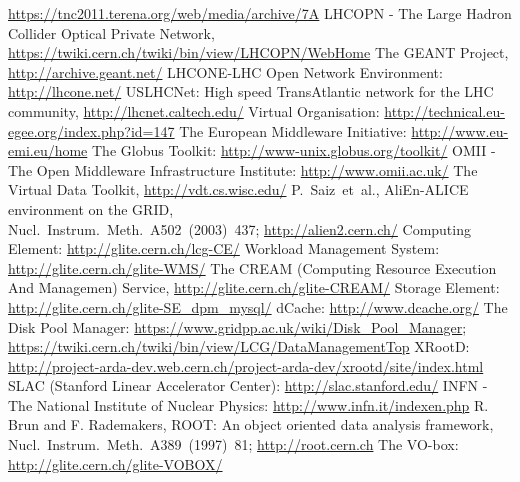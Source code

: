 \begin{thebibliography}{100}
       \newline\url{https://tnc2011.terena.org/web/media/archive/7A}
%
 LHCOPN - The Large Hadron Collider Optical Private Network,
\newline\url{https://twiki.cern.ch/twiki/bin/view/LHCOPN/WebHome}
%
 The GEANT Project, \url{http://archive.geant.net/}
%
 LHCONE-LHC Open Network Environment:
\newline\url{http://lhcone.net/}
%
 USLHCNet: High speed TransAtlantic network for the LHC community,
\newline\url{http://lhcnet.caltech.edu/}
%
%
 Virtual Organisation: \url{http://technical.eu-egee.org/index.php?id=147}
%
 The European Middleware Initiative:
\url{http://www.eu-emi.eu/home}
%
 The Globus Toolkit: \url{http://www-unix.globus.org/toolkit/}
%
OMII - The Open Middleware Infrastructure Institute:
\url{http://www.omii.ac.uk/}
%
 The Virtual Data Toolkit, \url{http://vdt.cs.wisc.edu/}
%
 P.~Saiz~et~al.,  AliEn-ALICE environment on the GRID,\\
Nucl.~Instrum.~Meth.~A502~(2003)~437; \url{http://alien2.cern.ch/}
%
 Computing Element: \url{http://glite.cern.ch/lcg-CE/}
%
 Workload Management System: \url{http://glite.cern.ch/glite-WMS/}
%
 The CREAM (Computing Resource Execution And Managemen) Service,
\newline\url{http://glite.cern.ch/glite-CREAM/}
%
 Storage Element: \url{http://glite.cern.ch/glite-SE_dpm_mysql/}
%
 dCache: \url{http://www.dcache.org/}
%
 The Disk Pool Manager:
\newline\url{https://www.gridpp.ac.uk/wiki/Disk_Pool_Manager};
\newline\url{https://twiki.cern.ch/twiki/bin/view/LCG/DataManagementTop}
%
 XRootD:
\newline\url{http://project-arda-dev.web.cern.ch/project-arda-dev/xrootd/site/index.html}
%
 SLAC (Stanford Linear Accelerator Center):
\url{http://slac.stanford.edu/}
%
 INFN - The National Institute of Nuclear Physics:
\newline\url{http://www.infn.it/indexen.php}
%
 R. Brun and F. Rademakers, ROOT: An object oriented data analysis framework,\\
Nucl.~Instrum.~Meth.~A389~(1997)~81; \url{http://root.cern.ch}
%
 The VO-box: \url{http://glite.cern.ch/glite-VOBOX/}

\end{thebibliography}
